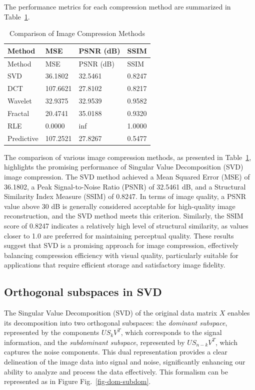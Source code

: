 \documentclass[
  journal,
]{IEEEtran}%
\begin{document}
The performance metrics for each compression method are summarized in
Table~\ref{tbl-image_compression_comparison}.

\begin{longtable}[]{@{}llll@{}}
\caption{Comparison of Image Compression
Methods}\label{tbl-image_compression_comparison}\tabularnewline
\toprule\noalign{}
Method & MSE & PSNR (dB) & SSIM \\
\midrule\noalign{}
\endfirsthead
\toprule\noalign{}
Method & MSE & PSNR (dB) & SSIM \\
\midrule\noalign{}
\endhead
\bottomrule\noalign{}
\endlastfoot
SVD & 36.1802 & 32.5461 & 0.8247 \\
DCT & 107.6621 & 27.8102 & 0.8217 \\
Wavelet & 32.9375 & 32.9539 & 0.9582 \\
Fractal & 20.4741 & 35.0188 & 0.9320 \\
RLE & 0.0000 & inf & 1.0000 \\
Predictive & 107.2521 & 27.8267 & 0.5477 \\
\end{longtable}

The comparison of various image compression methods, as presented in
Table~\ref{tbl-image_compression_comparison}, highlights the promising
performance of Singular Value Decomposition (SVD) image compression. The
SVD method achieved a Mean Squared Error (MSE) of 36.1802, a Peak
Signal-to-Noise Ratio (PSNR) of 32.5461 dB, and a Structural Similarity
Index Measure (SSIM) of 0.8247. In terms of image quality, a PSNR value
above 30 dB is generally considered acceptable for high-quality image
reconstruction, and the SVD method meets this criterion. Similarly, the
SSIM score of 0.8247 indicates a relatively high level of structural
similarity, as values closer to 1.0 are preferred for maintaining
perceptual quality. These results suggest that SVD is a promising
approach for image compression, effectively balancing compression
efficiency with visual quality, particularly suitable for applications
that require efficient storage and satisfactory image fidelity.

\subsection{Orthogonal subspaces in
SVD}\label{orthogonal-subspaces-in-svd}

The Singular Value Decomposition (SVD) of the original data matrix \(X\)
enables its decomposition into two orthogonal subspaces: the
\emph{dominant subspace}, represented by the components \(US_kV^T\),
which corresponds to the signal information, and the \emph{subdominant
subspace}, represented by \(US_{n-k}V^T\), which captures the noise
components. This dual representation provides a clear delineation of the
image data into signal and noise, significantly enhancing our ability to
analyze and process the data effectively. This formalism can be
represented as in Figure Fig.~\ref{fig-dom-subdom}.
\end{document}
